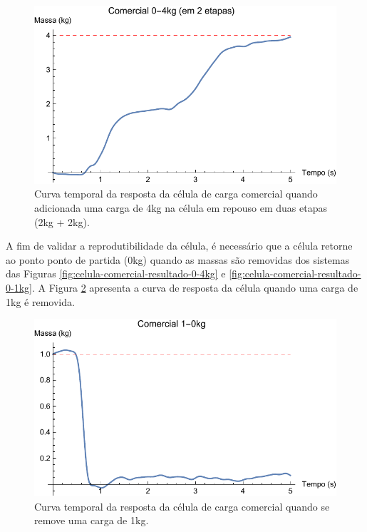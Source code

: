\documentclass[a4paper]{instrumentacao}
\begin{document}
\begin{figure}[H]
\center
\includegraphics[width=\textwidth]{Comercial_0-4kg_etapa.pdf}
\caption{Curva temporal da resposta da célula de carga comercial quando adicionada uma carga de 4kg na célula em repouso em duas etapas (2kg + 2kg).}
\label{fig:celula-comercial-resultado-0-4kg-etapa}
\end{figure} 

A fim de validar a reprodutibilidade da célula, é necessário que a célula retorne ao ponto ponto de partida (0kg) quando as massas são removidas dos sistemas das Figuras \ref{fig:celula-comercial-resultado-0-4kg} e \ref{fig:celula-comercial-resultado-0-1kg}. A Figura \ref{fig:celula-comercial-resultado-1-0kg} apresenta a curva de resposta da célula quando uma carga de 1kg é removida.

\begin{figure}[H]
\center
\includegraphics[width=\textwidth]{Comercial_1-0kg.pdf}
\caption{Curva temporal da resposta da célula de carga comercial quando se remove uma carga de 1kg.}
\label{fig:celula-comercial-resultado-1-0kg}
\end{figure}
\end{document}
